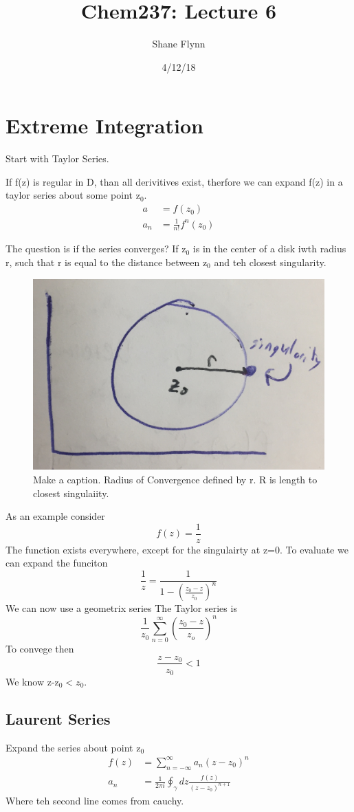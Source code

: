 \documentclass{article}
\title{Chem237: Lecture 6}
\date{4/12/18}
\author{Shane Flynn}
\newcommand{\be}{\begin{equation}}
\newcommand{\ee}{\end{equation}}
\begin{document}
\section*{Extreme Integration}
Start with Taylor Series.

If f(z) is regular in D, than all derivitives exist, therfore we can expand f(z) in a taylor series about some point z$_0$. 
\be
\begin{split}
    a &= f(z_0)\\
    a_n &= \frac{1}{n!} f^n(z_0)
\end{split}
\ee

The question is if the series converges?
If z$_0$ is in the center of a disk iwth radius r, such that r is equal to the distance between z$_0$ and teh closest singularity. 

\begin{figure}[H]
  \centering
    \includegraphics[scale=0.2]{Figures/converge.png}
    \caption{Make a caption. Radius of Convergence defined by r. R is length to closest singulaiity.}
\end{figure}

As an example consider 
\be
f(z) = \frac{1}{z}
\ee
The function exists everywhere, except for the singulairty at z=0. 
To evaluate we can expand the funciton
\be
\frac{1}{z} = \frac{1}{1-\left(\frac{z_0-z}{z_0}\right)^n}
\ee
We can now use a geometrix series
The Taylor series is
\be
\frac{1}{z_0} \sum_{n=0}^\infty \left(\frac{z_0-z}{z_o}\right)^n
\ee
To convege then 
\be
\frac{z-z_0}{z_0}< 1
\ee
We know z-z$_0 < z_0$. 

\subsection*{Laurent Series}
Expand the series about point z$_0$
\be
\begin{split}
    f(z) &= \sum_{n=-\infty}^\infty a_n (z-z_0)^n\\
    a_n &= \frac{1}{2\pi i} \oint_\gamma dz \frac{f(z)}{(z-z_0)^{n+1}}
\end{split}
\ee
Where teh second line comes from cauchy. 
\end{document}
